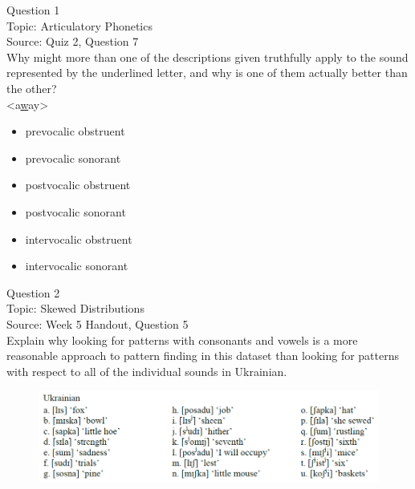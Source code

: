 \documentclass[12pt]{article}
\begin{document}
{\large Question 1}\\

Topic: Articulatory Phonetics\\
Source: Quiz 2, Question 7\\

Why might more than one of the descriptions given truthfully apply to the sound represented by the underlined letter, and why is one of them actually better than the other?\\

<a\underline{w}ay>

\begin{itemize} \item prevocalic obstruent \item prevocalic sonorant \item postvocalic obstruent \item postvocalic sonorant \item intervocalic obstruent \item intervocalic sonorant \end{itemize}


\newpage

{\large Question 2}\\

Topic: Skewed Distributions\\
Source: Week 5 Handout, Question 5\\

Explain why looking for patterns with consonants and vowels is a more reasonable approach to pattern finding in this dataset than looking for patterns with respect to all of the individual sounds in Ukrainian.\\

\begin{figure}[H]
\includegraphics{../images/ukrainian.png}
\end{figure}

\newpage

\begin{center}
\textbf{{\color{red}{\HUGE END OF EXAM}}}\\

\end{center}
\newpage
\end{document}
